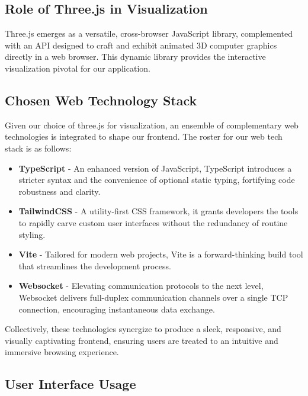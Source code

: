 \documentclass[11pt, a4paper,oneside,chapterprefix=false]{scrbook}
\begin{document}
\subsection{Role of Three.js in Visualization}

Three.js emerges as a versatile, cross-browser JavaScript library, complemented with an API designed to craft and exhibit animated 3D computer graphics directly in a web browser. This dynamic library provides the interactive visualization pivotal for our application.

\subsection{Chosen Web Technology Stack}

Given our choice of three.js for visualization, an ensemble of complementary web technologies is integrated to shape our frontend. The roster for our web tech stack is as follows:

\begin{itemize}
	\item \textbf{TypeScript} - An enhanced version of JavaScript, TypeScript introduces a stricter syntax and the convenience of optional static typing, fortifying code robustness and clarity.
	
	\item \textbf{TailwindCSS} - A utility-first CSS framework, it grants developers the tools to rapidly carve custom user interfaces without the redundancy of routine styling.
	
	\item \textbf{Vite} - Tailored for modern web projects, Vite is a forward-thinking build tool that streamlines the development process.
	
	\item \textbf{Websocket} - Elevating communication protocols to the next level, Websocket delivers full-duplex communication channels over a single TCP connection, encouraging instantaneous data exchange.
\end{itemize}

Collectively, these technologies synergize to produce a sleek, responsive, and visually captivating frontend, ensuring users are treated to an intuitive and immersive browsing experience.

\subsection{User Interface Usage}
\end{document}
